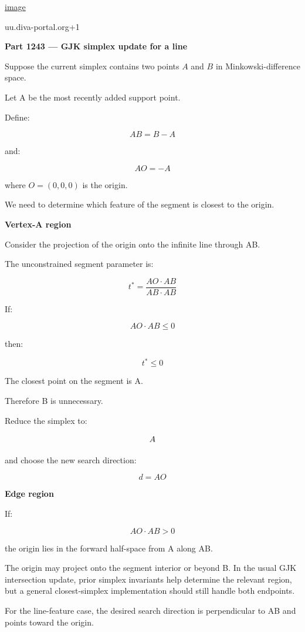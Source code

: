 \href{https://www.google.com/s2/favicons?domain=https://uu.diva-portal.org&sz=32}{image}

uu.diva-portal.org+1

\textbf{Part 1243 --- GJK simplex update for a line}

Suppose the current simplex contains two points \(A\) and \(B\) in Minkowski-difference space.

Let A be the most recently added support point.

Define:

\[
AB=B-A
\]

and:

\[
AO=-A
\]

where \(O=(0,0,0)\) is the origin.

We need to determine which feature of the segment is closest to the origin.

\textbf{Vertex-A region}

Consider the projection of the origin onto the infinite line through AB.

The unconstrained segment parameter is:

\[
t^*=\frac{AO\cdot AB}{AB\cdot AB}
\]

If:

\[
AO\cdot AB\le0
\]

then:

\[
t^*\le0
\]

The closest point on the segment is A.

Therefore B is unnecessary.

Reduce the simplex to:

\[
\\{A\\}
\]

and choose the new search direction:

\[
\boxed{d=AO}
\]

\textbf{Edge region}

If:

\[
AO\cdot AB>0
\]

the origin lies in the forward half-space from A along AB.

The origin may project onto the segment interior or beyond B. In the usual GJK intersection update, prior simplex invariants help determine the relevant region, but a general closest-simplex implementation should still handle both endpoints.

For the line-feature case, the desired search direction is perpendicular to AB and points toward the origin.

